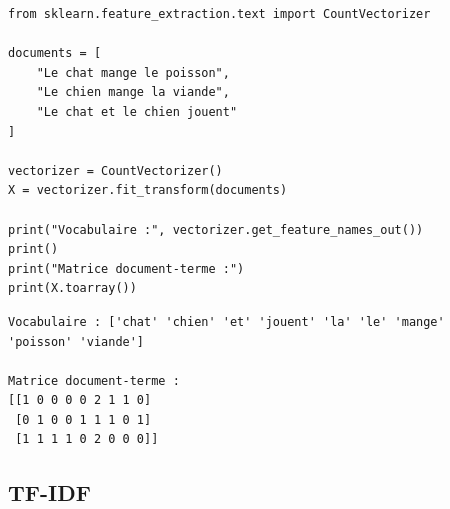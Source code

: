 \begin{center}
\end{center}

\begin{codeblock}[title=\textbf{Python}]
\begin{verbatim}
from sklearn.feature_extraction.text import CountVectorizer

documents = [
    "Le chat mange le poisson",
    "Le chien mange la viande",
    "Le chat et le chien jouent"
]

vectorizer = CountVectorizer()
X = vectorizer.fit_transform(documents)

print("Vocabulaire :", vectorizer.get_feature_names_out())
print()
print("Matrice document-terme :")
print(X.toarray())
\end{verbatim}
\end{codeblock}

\begin{codeoutput}
\begin{verbatim}
Vocabulaire : ['chat' 'chien' 'et' 'jouent' 'la' 'le' 'mange' 'poisson' 'viande']

Matrice document-terme :
[[1 0 0 0 0 2 1 1 0]
 [0 1 0 0 1 1 1 0 1]
 [1 1 1 1 0 2 0 0 0]]
\end{verbatim}
\end{codeoutput}

\subsection{TF-IDF}

